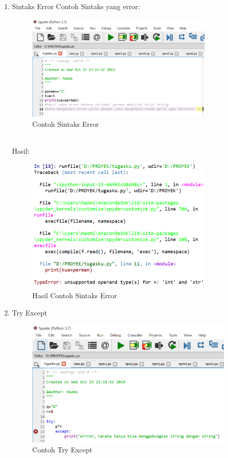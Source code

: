 \begin{enumerate}
\item Sintaks Error
Contoh Sintaks yang error:
    \begin{figure}[!htbp]
    \centering
    \includegraphics[width=9cm]{gambar2/error.png}
    \caption{Contoh Sintaks Error}
    \end{figure}\\
    Hasil:
    \begin{figure}[!htbp]
    \centering
    \includegraphics[width=9cm]{gambar2/error1.png}
    \caption{Hasil Contoh Sintaks Error}
    \end{figure}
\newpage
\item Try Except
    \begin{figure}[!htbp]
    \centering
    \includegraphics[width=10cm]{gambar2/try.png}
    \caption{Contoh Try Except}
    \end{figure}\\

\end{enumerate}
